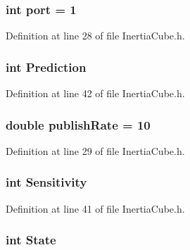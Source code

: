 \subsubsection[{port}]{\setlength{\rightskip}{0pt plus 5cm}int {\bf port} = 1}\label{InertiaCube_8h_a63c89c04d1feae07ca35558055155ffb}


\-Definition at line 28 of file \-Inertia\-Cube.\-h.

\subsubsection[{\-Prediction}]{\setlength{\rightskip}{0pt plus 5cm}int {\bf \-Prediction}}\label{InertiaCube_8h_a4c829686f847a22555c3ca1ba8b617a3}


\-Definition at line 42 of file \-Inertia\-Cube.\-h.

\subsubsection[{publish\-Rate}]{\setlength{\rightskip}{0pt plus 5cm}double {\bf publish\-Rate} = 10}\label{InertiaCube_8h_a7f5b716c830afb09122ad50eec8aaa45}


\-Definition at line 29 of file \-Inertia\-Cube.\-h.

\subsubsection[{\-Sensitivity}]{\setlength{\rightskip}{0pt plus 5cm}int {\bf \-Sensitivity}}\label{InertiaCube_8h_a1aefca8d2230b8157d45fb28693ef789}


\-Definition at line 41 of file \-Inertia\-Cube.\-h.

\subsubsection[{\-State}]{\setlength{\rightskip}{0pt plus 5cm}int {\bf \-State}}\label{InertiaCube_8h_a18de412e641d6e3d45d7a829923a29c3}


